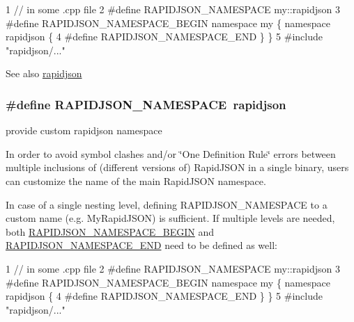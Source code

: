 \begin{DoxyCode}
1 // in some .cpp file
2 #define RAPIDJSON\_NAMESPACE my::rapidjson
3 #define RAPIDJSON\_NAMESPACE\_BEGIN namespace my \{ namespace rapidjson \{
4 #define RAPIDJSON\_NAMESPACE\_END   \} \}
5 #include "rapidjson/..."
\end{DoxyCode}


\begin{DoxySeeAlso}{See also}
\hyperlink{namespacerapidjson}{rapidjson} 
\end{DoxySeeAlso}
\subsubsection[{\texorpdfstring{R\+A\+P\+I\+D\+J\+S\+O\+N\+\_\+\+N\+A\+M\+E\+S\+P\+A\+CE}{RAPIDJSON_NAMESPACE}}]{\setlength{\rightskip}{0pt plus 5cm}\#define R\+A\+P\+I\+D\+J\+S\+O\+N\+\_\+\+N\+A\+M\+E\+S\+P\+A\+CE~rapidjson}\hypertarget{group___r_a_p_i_d_j_s_o_n___c_o_n_f_i_g_ga743a79d3af927391fe3eb5c979136899}{}\label{group___r_a_p_i_d_j_s_o_n___c_o_n_f_i_g_ga743a79d3af927391fe3eb5c979136899}


provide custom rapidjson namespace 

In order to avoid symbol clashes and/or \char`\"{}\+One Definition Rule\char`\"{} errors between multiple inclusions of (different versions of) Rapid\+J\+S\+ON in a single binary, users can customize the name of the main Rapid\+J\+S\+ON namespace.

In case of a single nesting level, defining {\ttfamily R\+A\+P\+I\+D\+J\+S\+O\+N\+\_\+\+N\+A\+M\+E\+S\+P\+A\+CE} to a custom name (e.\+g. {\ttfamily My\+Rapid\+J\+S\+ON}) is sufficient. If multiple levels are needed, both \hyperlink{group___r_a_p_i_d_j_s_o_n___c_o_n_f_i_g_gad3806c8251fdc7da9618b7e922674ffc}{R\+A\+P\+I\+D\+J\+S\+O\+N\+\_\+\+N\+A\+M\+E\+S\+P\+A\+C\+E\+\_\+\+B\+E\+G\+IN} and \hyperlink{group___r_a_p_i_d_j_s_o_n___c_o_n_f_i_g_gaf18f052a98b9f5df5448d39484b743c1}{R\+A\+P\+I\+D\+J\+S\+O\+N\+\_\+\+N\+A\+M\+E\+S\+P\+A\+C\+E\+\_\+\+E\+ND} need to be defined as well\+:


\begin{DoxyCode}
1 // in some .cpp file
2 #define RAPIDJSON\_NAMESPACE my::rapidjson
3 #define RAPIDJSON\_NAMESPACE\_BEGIN namespace my \{ namespace rapidjson \{
4 #define RAPIDJSON\_NAMESPACE\_END   \} \}
5 #include "rapidjson/..."
\end{DoxyCode}


